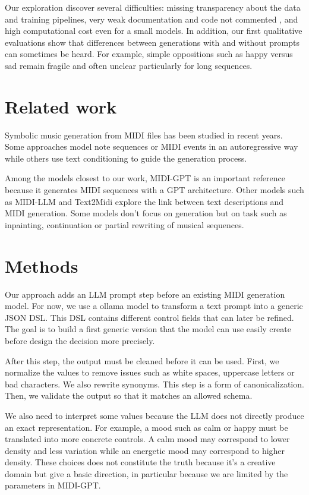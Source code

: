 \documentclass[11pt]{article}
\begin{document}
Our exploration discover several difficulties: missing transparency about the data and training pipelines, very weak documentation and code not commented , and high computational cost even for a small models. In addition, our first qualitative evaluations show that differences between generations with and without prompts can sometimes be heard. For example, simple oppositions such as happy versus sad remain fragile and often unclear particularly for long sequences.

\section{Related work}

Symbolic music generation from MIDI files has been studied in recent years. Some approaches model note sequences or MIDI events in an autoregressive way while others use text conditioning to guide the generation process.

Among the models closest to our work, MIDI-GPT \cite{Pasquier2025MIDIGPT} is an important reference because it generates MIDI sequences with a GPT architecture. Other models such as MIDI-LLM \cite{Wu2025MIDILLM} and Text2Midi \cite{Bhandari2025Text2midi} explore the link between text descriptions and MIDI generation. Some models don't focus on generation but on task such as inpainting, continuation or partial rewriting of musical sequences.

\section{Methods}

Our approach adds an LLM prompt step before an existing MIDI generation model. For now, we use a ollama model to transform a text prompt into a generic JSON DSL. This DSL contains different control fields that can later be refined. The goal is to build a first generic version that the model can use easily create before design the decision more precisely.

After this step, the output must be cleaned before it can be used. First, we normalize the values to remove issues such as white spaces, uppercase letters or bad characters. We also rewrite synonyms. This step is a form of canonicalization. Then, we validate the output so that it matches an allowed schema.

We also need to interpret some values because the LLM does not directly produce an exact representation. For example, a mood such as calm or happy must be translated into more concrete controls. A calm mood may correspond to lower density and less variation while an energetic mood may correspond to higher density. These choices does not constitute the truth because it's a creative domain but give a basic direction, in particular because we are limited by the parameters in MIDI-GPT.
\end{document}
